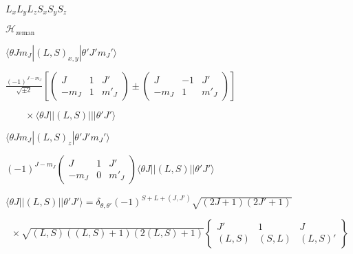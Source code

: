 \documentclass[twoside]{article}
\def\lthtmlcheckvsize{\ifdim\ht\sizebox<\vsize 
  \ifdim\wd\sizebox<\hsize\expandafter\hfill\fi \expandafter\vfill
  \else\expandafter\vss\fi}%
\begin{document}
{\newpage\clearpage
{}%
$L_x L_y L_z S_x S_y S_z$%
\lthtmlindisplaymathZ
\lthtmlcheckvsize\clearpage}

{\newpage\clearpage
{}%
$\mathcal H_{\mathrm{zeman}}$%
\lthtmlindisplaymathZ
\lthtmlcheckvsize\clearpage}

{\newpage\clearpage
{}%
$\displaystyle \langle \theta Jm_J|(L,S)_{x,y}|\theta'J'm_J'\rangle$%
\lthtmlindisplaymathZ
\lthtmlcheckvsize\clearpage}

{\newpage\clearpage
{}%
$\displaystyle \frac{(-1)^{J-m_J}}{\sqrt{\pm 2}}
\left[ \left( \begin{array}{ccc} J&1&J' \\  -m_J& 1&m'_J \end{array} \right) \pm \left( \begin{array}{ccc} J&-1&J' \\  -m_J&1&m'_J \end{array} \right) \right]$%
\lthtmlindisplaymathZ
\lthtmlcheckvsize\clearpage}

{\newpage\clearpage
{}%
$\displaystyle \qquad \times \langle \theta J||(L,S)|||\theta'J'\rangle$%
\lthtmlindisplaymathZ
\lthtmlcheckvsize\clearpage}

{\newpage\clearpage
{}%
$\displaystyle \langle \theta Jm_J|(L,S)_z|\theta'J'm_J'\rangle$%
\lthtmlindisplaymathZ
\lthtmlcheckvsize\clearpage}

{\newpage\clearpage
{}%
$\displaystyle (-1)^{J-m_J}
\left( \begin{array}{ccc} J&1&J' \\  -m_J&0&m'_J \end{array} \right) \langle \theta J||(L,S)||\theta'J'\rangle$%
\lthtmlindisplaymathZ
\lthtmlcheckvsize\clearpage}

{\newpage\clearpage
{}%
$\displaystyle \langle \theta J||(L,S)||\theta'J'\rangle  = \delta_{\theta,\theta'} (-1)^{S+L+(J,J')} \sqrt{(2J+1)(2J'+1)}$%
\lthtmlindisplaymathZ
\lthtmlcheckvsize\clearpage}

{\newpage\clearpage
{}%
$\displaystyle \;\;\times \sqrt{(L,S)((L,S)+1)(2(L,S)+1)} \left\{ \begin{array}{ccc} J'&1&J \\   (L,S) &
(S,L) & (L,S)' \end{array} \right\}$%
\lthtmlindisplaymathZ
\lthtmlcheckvsize\clearpage}
\end{document}
